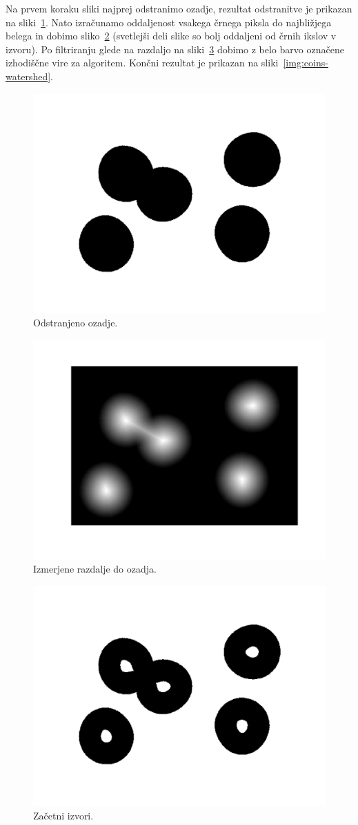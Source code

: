 \documentclass[a4paper, 11pt]{article}
\begin{document}
Na prvem koraku sliki najprej odstranimo ozadje, rezultat odstranitve je prikazan na sliki~\ref{img:coins-bg-rem}. Nato izračunamo oddaljenost vsakega črnega piksla do najbližjega belega in dobimo sliko~\ref{img:coins-distance} (svetlejši deli slike so bolj oddaljeni od črnih ikslov v izvoru). Po filtriranju glede na razdaljo na sliki~\ref{img:coins-seeds} dobimo z belo barvo označene izhodiščne vire za algoritem. Končni rezultat je prikazan na sliki~\ref{img:coins-watershed}.

\begin{figure}[htb]
  \centering
  \includegraphics[width=.5\textwidth]{coins-bg-rem}
  \caption{Odstranjeno ozadje.}
  \label{img:coins-bg-rem}
\end{figure}

\begin{figure}[htb]
  \centering
  \includegraphics[width=.5\textwidth]{coins-distance}
  \caption{Izmerjene razdalje do ozadja.}
  \label{img:coins-distance}
\end{figure}

\begin{figure}[htb]
  \centering
  \includegraphics[width=.5\textwidth]{coins-seeds}
  \caption{Začetni izvori.}
  \label{img:coins-seeds}
\end{figure}
\end{document}
